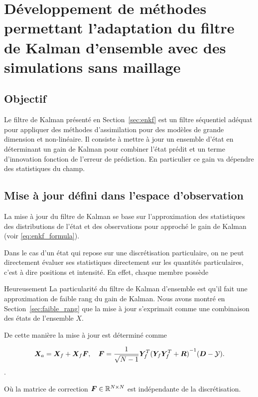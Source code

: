 
\section{Développement de méthodes permettant l'adaptation du filtre de Kalman d'ensemble avec des simulations sans maillage}

\subsection{Objectif}
Le filtre de Kalman présenté en Section~\ref*{sec:enkf} est un filtre séquentiel adéquat pour appliquer des méthodes d'assimilation pour des modèles de grande dimension et non-linéaire. Il consiste à mettre à jour un ensemble d'état en déterminant un gain de Kalman pour combiner l'état prédit et un terme d'innovation fonction de l'erreur de prédiction. En particulier ce gain va dépendre des statistiques du champ.

\subsection{Mise à jour défini dans l'espace d'observation}

La mise à jour du filtre de Kalman se base sur l'approximation des statistiques des distributions de l'état et des observations pour approché le gain de Kalman (voir \eqref{eq:enkf_formula}).

Dans le cas d'un état qui repose sur une discrétisation particulaire, on ne peut directement évaluer ses statistiques directement sur les quantités particulaires, c'est à dire positions et intensité. En effet, chaque membre possède


Heureusement La particularité du filtre de Kalman d'ensemble est qu'il fait une approximation de faible rang du gain de Kalman. Nous avons montré en Section~\ref{sec:faible_rang} que la mise à jour s'exprimait comme une combinaison des états de l'ensemble $X$.

De cette manière la mise à jour est déterminé comme

\begin{equation*}
    \bm{X}_a = \bm{X}_f + \bm{X}_f \bm{F}, \quad \bm{F} = \frac{1}{\sqrt{N-1}} \bm Y_f^T {(\bm Y_f \bm Y_f^T + \bm R)}^{-1}(\bm{D} - \mathcal{Y}).
\end{equation*}.

Où la matrice de correction $\bm{F} \in \mathbb{R}^{N\times N}$ est indépendante de la discrétisation.

